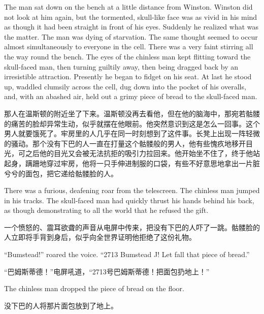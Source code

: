 \begin{paracol}{2}
\switchcolumn*

The man sat down on the bench at a little distance from Winston. Winston
did not look at him again, but the tormented, skull-like face was as
vivid in his mind as though it had been straight in front of his eyes.
Suddenly he realized what was the matter. The man was dying of
starvation. The same thought seemed to occur almost simultaneously to
everyone in the cell. There was a very faint stirring all the way round
the bench. The eyes of the chinless man kept flitting toward the
skull-faced man, then turning guiltily away, then being dragged back by
an irresistible attraction. Presently he began to fidget on his seat. At
last he stood up, waddled clumsily across the cell, dug down into the
pocket of his overalls, and, with an abashed air, held out a grimy piece
of bread to the skull-faced man.

\switchcolumn

那人在温斯顿的附近坐了下来。温斯顿没再去看他，但在他的脑海中，那宛若骷髅的痛苦的脸却异常生动，似乎就摆在他眼前。他突然意识到这是怎么一回事。这个男人就要饿死了。牢房里的人几乎在同一时刻想到了这件事。长凳上出现一阵轻微的骚动。那个没有下巴的人一直在打量这个骷髅般的男人，他有些愧疚地移开目光，可之后他的目光又会被无法抗拒的吸引力拉回来。他开始坐不住了，终于他站起身，蹒跚地穿过牢房，他将一只手伸进制服的口袋，有些不好意思地拿出一片脏兮兮的面包，把它递给骷髅脸的人。

\switchcolumn*

There was a furious, deafening roar from the telescreen. The chinless
man jumped in his tracks. The skull-faced man had quickly thrust his
hands behind his back, as though demonstrating to all the world that he
refused the gift.

\switchcolumn

一个愤怒的、震耳欲聋的声音从电屏中传来，把没有下巴的人吓了一跳。骷髅脸的人立即将手背到身后，似乎向全世界证明他拒绝了这份礼物。

\switchcolumn*

``Bumstead!'' roared the voice. ``2713 Bumstead J! Let fall that piece of
bread.''

\switchcolumn

``巴姆斯蒂德！''电屏吼道，``2713号巴姆斯蒂德！把面包扔地上！''

\switchcolumn*

The chinless man dropped the piece of bread on the floor.

\switchcolumn

没下巴的人将那片面包放到了地上。


\end{paracol}
